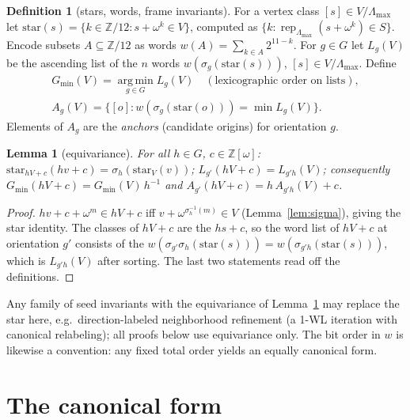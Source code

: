 \documentclass[11pt]{article}
\newtheorem{lemma}[theorem]{Lemma}
\theoremstyle{definition}
\newtheorem{definition}[theorem]{Definition}
\newcommand{\Zw}{\mathbb{Z}[\omega]}
\newcommand{\Z}{\mathbb{Z}}
\newcommand{\Lmax}{\Lambda_{\max}}
\newcommand{\Gmin}{G_{\min}}
\newcommand{\rep}{\operatorname{rep}}
\newcommand{\word}{w}
\begin{document}
\begin{definition}[stars, words, frame invariants]\label{def:star}
For a vertex class $[s]\in V/\Lmax$ let
$\mathrm{star}(s)=\{k\in\Z/12 : s+\omega^k\in V\}$, computed as
$\{k:\rep_{\Lmax}(s+\omega^k)\in S\}$. Encode subsets $A\subseteq\Z/12$ as words
$\word(A)=\sum_{k\in A}2^{11-k}$. For $g\in G$ let $L_g(V)$ be the ascending list of the
$n$ words $\word(\sigma_g(\mathrm{star}(s)))$, $[s]\in V/\Lmax$. Define
\begin{gather*}
  \Gmin(V)=\operatorname*{arg\,min}_{g\in G} L_g(V)
  \quad(\text{lexicographic order on lists}),\\
  A_g(V)=\{[o] : \word(\sigma_g(\mathrm{star}(o)))=\min L_g(V)\}.
\end{gather*}
Elements of $A_g$ are the \emph{anchors} (candidate origins) for orientation $g$.
\end{definition}

\begin{lemma}[equivariance]\label{lem:equiv}
For all $h\in G$, $c\in\Zw$:
$\mathrm{star}_{hV+c}(hv+c)=\sigma_h(\mathrm{star}_V(v))$;
$L_{g'}(hV+c)=L_{g'h}(V)$; consequently $\Gmin(hV+c)=\Gmin(V)\,h^{-1}$ and
$A_{g'}(hV+c)=h\,A_{g'h}(V)+c$.
\end{lemma}

\begin{proof}
$hv+c+\omega^m\in hV+c$ iff $v+\omega^{\sigma_h^{-1}(m)}\in V$ (Lemma~\ref{lem:sigma}),
giving the star identity. The classes of $hV+c$ are the $hs+c$, so the word list of
$hV+c$ at orientation $g'$ consists of the
$\word(\sigma_{g'}\sigma_h(\mathrm{star}(s)))=\word(\sigma_{g'h}(\mathrm{star}(s)))$,
which is $L_{g'h}(V)$ after sorting. The last two statements read off the definitions.
\end{proof}

Any family of seed invariants with the equivariance of Lemma~\ref{lem:equiv} may replace
the star here, e.g.\ direction-labeled neighborhood refinement (a 1-WL iteration with
canonical relabeling); all proofs below use equivariance only. The bit order in $\word$ is
likewise a convention: any fixed total order yields an equally canonical form.

\section{The canonical form}\label{sec:form}
\end{document}
